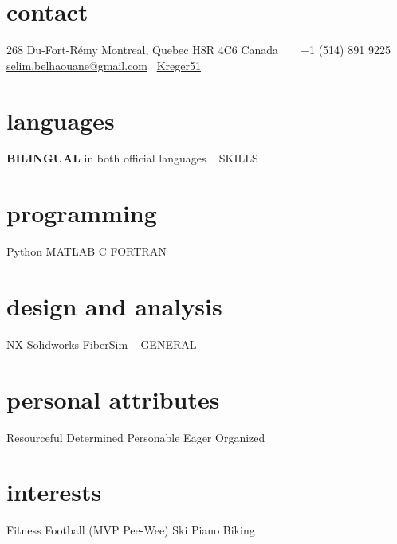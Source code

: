 \documentclass[]{friggeri-cv-mod} %
\newcommand\CC{C\nolinebreak[4]\hspace{-.05em}\raisebox{.4ex}{\relsize{-2}{\textbf{++}}}}
\begin{document}

\begin{aside} %
\section{contact}
268 Du-Fort-Rémy
Montreal, Quebec 
H8R 4C6
Canada
~
\Mobilefone ~ +1 (514) 891 9225
\Letter ~ \href{mailto:selim.belhaouane@gmail.com}{selim.belhaouane@gmail.com}
{\larger\FA\faGithub}~\href{https://github.com/Kreger51}{Kreger51} %
%
\section{languages}
\textbf{BILINGUAL} in both official languages
~
{\LARGE SKILLS}
\section{programming}
Python
MATLAB
\CC
FORTRAN
\section{design and analysis}
NX
Solidworks
FiberSim
%
~
{\LARGE GENERAL}
\section{personal attributes}
Resourceful
Determined
Personable
Eager
Organized
\section{interests}
Fitness
Football (MVP Pee-Wee)
Ski
Piano
Biking
\end{aside}
\end{document}
